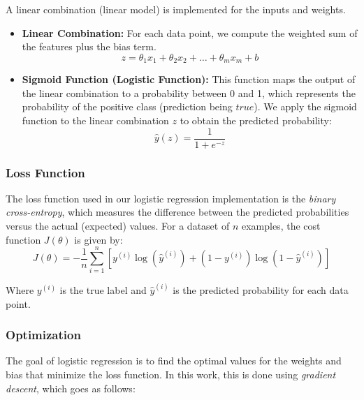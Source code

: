 \documentclass{article}
\theoremstyle{plain}
\theoremstyle{definition}
\theoremstyle{remark}
\begin{document}
A linear combination (linear model) is implemented for the inputs and weights.

\begin{itemize}

\item \textbf{Linear Combination:} For each data point, we compute the weighted sum of the features plus the bias term.
$$
z = \theta_1 x_1 + \theta_2 x_2 + \dots + \theta_m x_m + b
$$

\item \textbf{Sigmoid Function (Logistic Function):} This function maps the output of the linear combination to a probability between 0 and 1, which represents the probability of the positive class (prediction being $true$). We apply the sigmoid function to the linear combination $z$ to obtain the predicted probability:
$$
\hat{y}(z) = \frac{1}{1 + e^{-z}}
$$

\end{itemize}


\subsubsection{Loss Function}

The loss function used in our logistic regression implementation is the \textit{binary cross-entropy}, which measures the difference between the predicted probabilities versus the actual (expected) values. For a dataset of $n$ examples, the cost function $J(\theta)$ is given by:
$$
J(\theta) = -\frac{1}{n} \sum_{i=1}^{n} \left[ y^{(i)} \log(\hat{y}^{(i)}) + (1 - y^{(i)}) \log(1 - \hat{y}^{(i)}) \right]
$$

Where $y^{(i)}$ is the true label and $\hat{y}^{(i)}$ is the predicted probability for each data point.


\subsubsection{Optimization}

The goal of logistic regression is to find the optimal values for the weights and bias that minimize the loss function. In this work, this is done using \textit{gradient descent}, which goes as follows:
\end{document}
